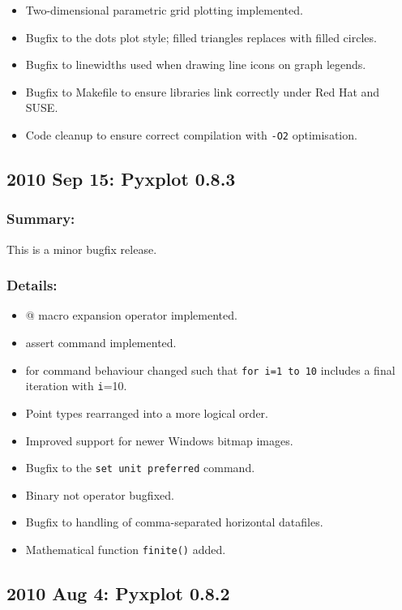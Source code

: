 \begin{itemize}
\item Two-dimensional parametric grid plotting implemented.
\item Bugfix to the dots plot style; filled triangles replaces with filled circles.
\item Bugfix to linewidths used when drawing line icons on graph legends.
\item Bugfix to Makefile to ensure libraries link correctly under Red Hat and SUSE.
\item Code cleanup to ensure correct compilation with {\tt -O2} optimisation.
\end{itemize}

\subsection*{2010 Sep 15: Pyxplot 0.8.3}

\subsubsection*{Summary:}

This is a minor bugfix release.

\subsubsection*{Details:}

\begin{itemize}
\item @ macro expansion operator implemented.
\item assert command implemented.
\item for command behaviour changed such that {\tt for i=1 to 10} includes a final iteration with {\tt i}=10.
\item Point types rearranged into a more logical order.
\item Improved support for newer Windows bitmap images.
\item Bugfix to the {\tt set unit preferred} command.
\item Binary not operator bugfixed.
\item Bugfix to handling of comma-separated horizontal datafiles.
\item Mathematical function {\tt finite()} added.
\end{itemize}

\subsection*{2010 Aug 4: Pyxplot 0.8.2}

